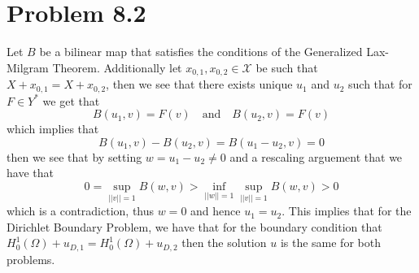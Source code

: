 \documentclass[12pt]{report}
\newcommand{\norm}[1]{\left|\left|#1\right|\right|}
\begin{document}
\maketitle

\section*{Problem 8.2}
Let $B$ be a bilinear map that satisfies the conditions of the Generalized Lax-Milgram Theorem. Additionally let $x_{0,1},x_{0,2} \in \mathcal{X}$ be such that $X + x_{0,1} = X + x_{0,2}$, then we see that there exists unique $u_1$ and $u_2$ such that for $F \in Y^*$ we get that
\begin{equation*}
  B(u_1,v) = F(v) \quad \text{and} \quad B(u_2,v) = F(v) 
\end{equation*}
which implies that
\begin{equation*}
  B(u_1,v) - B(u_2,v) = B(u_1 - u_2, v) = 0
\end{equation*}
then we see that by setting $w = u_1 - u_2 \neq 0$ and a rescaling arguement that we have that
\begin{equation*}
  0 = \sup_{\norm{v} = 1} B(w,v) >  \inf_{\norm{w} = 1} \sup_{\norm{v} = 1} B(w,v) > 0
\end{equation*}
which is a contradiction, thus $w = 0$ and hence $u_1 = u_2$. This implies that for the Dirichlet Boundary Problem, we have that for the boundary condition that $H_0^1(\Omega) + u_{D,1} = H_0^1(\Omega) + u_{D,2}$ then the solution $u$ is the same for both problems. 
\end{document}
